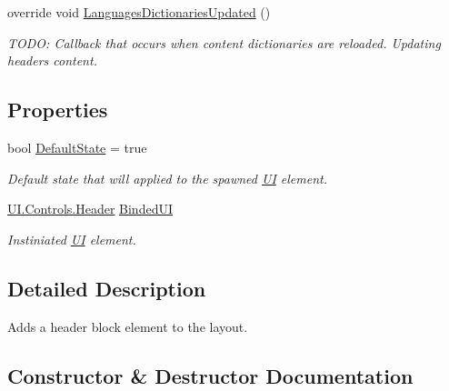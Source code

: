 \begin{DoxyCompactItemize}
override void \mbox{\hyperlink{class_wpf_handler_1_1_u_i_1_1_auto_layout_1_1_controls_1_1_header_attribute_ae2587a69606cda16cc87e901140f113a}{Languages\+Dictionaries\+Updated}} ()
\begin{DoxyCompactList}\small\item\em T\+O\+DO\+: Callback that occurs when content dictionaries are reloaded. Updating header\textquotesingle{}s content. \end{DoxyCompactList}\end{DoxyCompactItemize}
\subsection*{Properties}
\begin{DoxyCompactItemize}
\item 
bool \mbox{\hyperlink{class_wpf_handler_1_1_u_i_1_1_auto_layout_1_1_controls_1_1_header_attribute_a37e39441398bd5aa132da26eb23e9349}{Default\+State}} = true
\begin{DoxyCompactList}\small\item\em Default state that will applied to the spawned \mbox{\hyperlink{namespace_wpf_handler_1_1_u_i}{UI}} element. \end{DoxyCompactList}\item 
\mbox{\hyperlink{class_wpf_handler_1_1_u_i_1_1_controls_1_1_header}{U\+I.\+Controls.\+Header}} \mbox{\hyperlink{class_wpf_handler_1_1_u_i_1_1_auto_layout_1_1_controls_1_1_header_attribute_a27af4560ad16335bf2c210692949c1c5}{Binded\+UI}}
\begin{DoxyCompactList}\small\item\em Instiniated \mbox{\hyperlink{namespace_wpf_handler_1_1_u_i}{UI}} element. \end{DoxyCompactList}\end{DoxyCompactItemize}


\subsection{Detailed Description}
Adds a header block element to the layout. 



\subsection{Constructor \& Destructor Documentation}
\mbox{\label{class_wpf_handler_1_1_u_i_1_1_auto_layout_1_1_controls_1_1_header_attribute_a0c0c74638fa9192803be651427641a7c}} 
